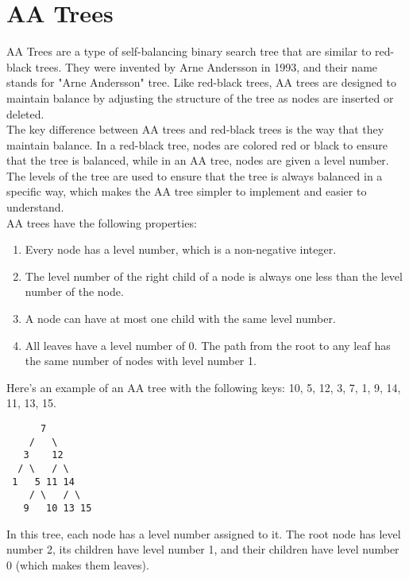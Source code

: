 \documentclass[11pt]{article}
\begin{document}
\tableofcontents
\thispagestyle{empty}
\clearpage

\setcounter{page}{1}

\section{AA Trees}

AA Trees are a type of self-balancing binary search tree that are similar to red-black trees. They were invented by Arne Andersson in 1993, and their name stands for "Arne Andersson" tree. Like red-black trees, AA trees are designed to maintain balance by adjusting the structure of the tree as nodes are inserted or deleted.\\

The key difference between AA trees and red-black trees is the way that they maintain balance. In a red-black tree, nodes are colored red or black to ensure that the tree is balanced, while in an AA tree, nodes are given a level number. The levels of the tree are used to ensure that the tree is always balanced in a specific way, which makes the AA tree simpler to implement and easier to understand.\\

AA trees have the following properties:
\begin{enumerate}
    \item Every node has a level number, which is a non-negative integer.
    \item    The level number of the right child of a node is always one less than the level number of the node.
    \item    A node can have at most one child with the same level number.
    \item    All leaves have a level number of 0.
          The path from the root to any leaf has the same number of nodes with level number 1.
\end{enumerate}

Here's an example of an AA tree with the following keys: 10, 5, 12, 3, 7, 1, 9, 14, 11, 13, 15.

\begin{verbatim}
      7
    /   \
   3    12
  / \   / \
 1   5 11 14
    / \   / \
   9   10 13 15
\end{verbatim}

In this tree, each node has a level number assigned to it. The root node has level number 2, its children have level number 1, and their children have level number 0 (which makes them leaves).\\
\end{document}
